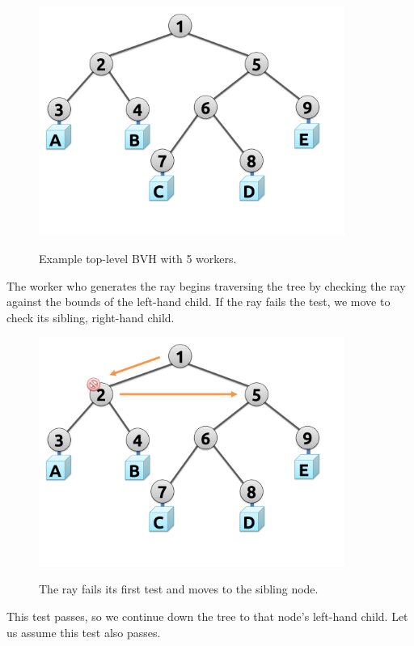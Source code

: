 \documentclass[12pt]{ucthesis}
\newcommand{\captionfonts}{\small\bf\ssp}
\begin{document}
\begin{figure}[H]
    \centering
    \includegraphics[width=100mm]{figures/traversal1.pdf}
    \captionfonts
    \caption{Example top-level BVH with 5 workers.}
    \label{fig:traversal1}
\end{figure}

The worker who generates the ray begins traversing the tree by checking the ray
against the bounds of the left-hand child. If the ray fails the test, we move
to check its sibling, right-hand child.

\begin{figure}[H]
    \centering
    \includegraphics[width=100mm]{figures/traversal2.pdf}
    \captionfonts
    \caption{The ray fails its first test and moves to the sibling node.}
    \label{fig:traversal2}
\end{figure}

This test passes, so we continue down the tree to that node's left-hand child.
Let us assume this test also passes.
\end{document}
